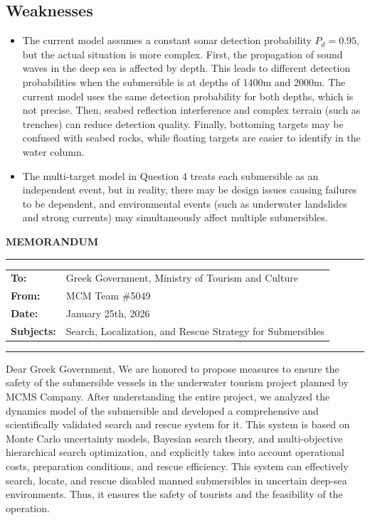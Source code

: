 \documentclass{mcmthesis}
\begin{document}
\subsection{Weaknesses}
\begin{itemize}
  \item The current model assumes a constant sonar detection probability $P_d = 0.95$, but the actual situation is more complex.
First, the propagation of sound waves in the deep sea is affected by depth.
This leads to different detection probabilities when the submersible is at depths of 1400m and 2000m.
The current model uses the same detection probability for both depths, which is not precise.
Then, seabed reflection interference and complex terrain (such as trenches) can reduce detection quality.
Finally, bottoming targets may be confused with seabed rocks, while floating targets are easier to identify in the water column.
  \item The multi-target model in Question 4 treats each submersible as an independent event,
but in reality, there may be design issues causing failures to be dependent,
and environmental events (such as underwater landslides and strong currents) may simultaneously affect multiple submersibles.
\end{itemize}
\newpage
{}
\nocite{*} 
  
\appendix
\newpage
{}
\begin{center}
\textbf{\Large MEMORANDUM}
\end{center}

\vspace{0.3cm}
\noindent\rule{\textwidth}{1.5pt}
\begin{tabular}{@{}ll@{}}
\textbf{To:} & Greek Government, Ministry of Tourism and Culture \\
\textbf{From:} & MCM Team \#5049\\
\textbf{Date:} & January 25th, 2026 \\
\textbf{Subjects:} & Search, Localization, and Rescue Strategy for Submersibles 
\end{tabular}

\noindent\rule{\textwidth}{1.5pt}
Dear Greek Government,
We are honored to propose measures to ensure the safety of the submersible vessels in the underwater tourism project planned by MCMS Company.
After understanding the entire project, we analyzed the dynamics model of the submersible and developed a comprehensive and scientifically validated search and rescue system for it.
This system is based on Monte Carlo uncertainty models, Bayesian search theory, and multi-objective hierarchical search optimization,
and explicitly takes into account operational costs, preparation conditions, and rescue efficiency.
This system can effectively search, locate, and rescue disabled manned submersibles in uncertain deep-sea environments.
Thus, it ensures the safety of tourists and the feasibility of the operation.
\end{document}
